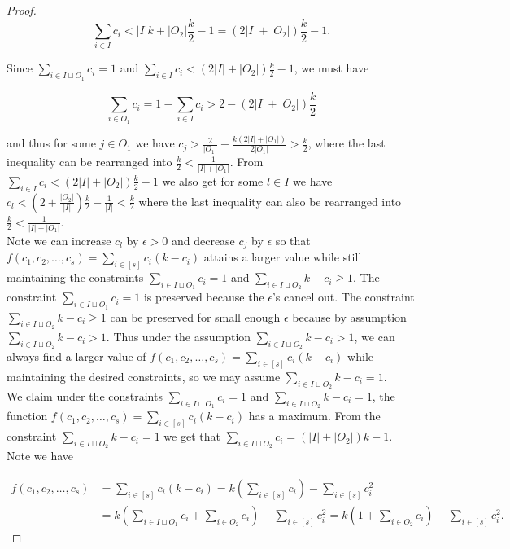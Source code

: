 \documentclass[10pt,a4paper]{amsart}
\begin{document}
\begin{proof}
$$\sum_{i \in I} c_i < |I|k + |O_2|\frac{k}{2} - 1 = (2|I| + |O_2|)\frac{k}{2}-1. $$ 

Since $\sum_{i \in I \sqcup O_1} c_i = 1$ and $\sum_{i \in I} c_i < (2|I| + |O_2|)\frac{k}{2}-1$, we must have 

$$\sum_{i \in O_1} c_i = 1-\sum_{i \in I} c_i > 2-(2|I| + |O_2|)\frac{k}{2}$$

\noindent
and thus for some $j \in O_1$ we have $c_j > \frac{2}{|O_1|} - \frac{k(2|I|+|O_1|)}{2|O_1|} > \frac{k}{2}$, where the last inequality can be rearranged into $\frac{k}{2} < \frac{1}{|I|+|O_1|}$. From $\sum_{i \in I} c_i <  (2|I| + |O_2|)\frac{k}{2}-1 $ we also get for some $l \in I$ we have $c_l < (2+\frac{|O_2|}{|I|})\frac{k}{2} - \frac{1}{|I|} < \frac{k}{2}$ where the last inequality can also be rearranged into $\frac{k}{2} < \frac{1}{|I|+|O_1|}$. \\

Note we can increase $c_l$ by $\epsilon > 0$ and decrease $c_j$ by $\epsilon$ so that $f(c_1,c_2,\ldots,c_{s}) = \sum_{i \in [s]} c_i(k-c_i)$ attains a larger value while still maintaining the constraints $\sum_{i \in I \sqcup O_1} c_i = 1$ and $\sum_{i \in I \sqcup O_2 } k-c_i \geq 1$. The constraint $\sum_{i \in I \sqcup O_1} c_i = 1$ is preserved because the $\epsilon$'s cancel out. The constraint $\sum_{i \in I \sqcup O_2 } k-c_i \geq 1$ can be preserved for small enough $\epsilon$ because by assumption $\sum_{i \in I \sqcup O_2 } k-c_i > 1$. Thus under the assumption $\sum_{i \in I \sqcup O_2 } k-c_i > 1$, we can always find a larger value of $f(c_1,c_2,\ldots,c_{s}) = \sum_{i \in [s]} c_i(k-c_i)$ while maintaining the desired constraints, so we may assume $\sum_{i \in I \sqcup O_2} k-c_i = 1$. \\

We claim under the constraints $\sum_{i \in I \sqcup O_1} c_i = 1$ and $\sum_{i \in I \sqcup O_2 } k-c_i = 1$, the function $f(c_1,c_2,\ldots,c_{s}) = \sum_{i \in [s]} c_i(k-c_i)$ has a maximum. From the constraint $\sum_{i \in I \sqcup O_2 } k-c_i = 1$ we get that $\sum_{i \in I \sqcup O_2} c_i = (|I| + |O_2|)k-1$. Note we have

\begin{align*}
f(c_1,c_2,\ldots,c_{s}) &= \sum_{i \in [s]} c_i(k-c_i) = k \left( \sum_{i \in [s]} c_i \right) - \sum_{i \in [s]} c_i^2 \\
&= k \left( \sum_{i \in I \sqcup O_1} c_i + \sum_{i \in O_2} c_i \right) - \sum_{i \in [s]} c_i^2 = k \left( 1+ \sum_{i \in O_2} c_i \right) - \sum_{i \in [s]} c_i^2.
\end{align*}


\end{proof}
\end{document}

